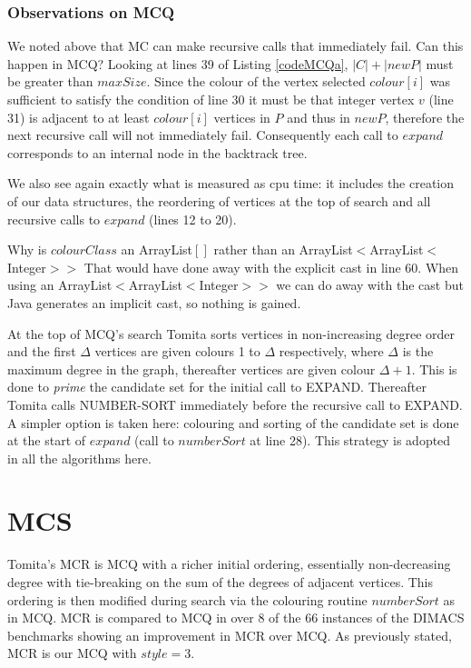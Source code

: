 \documentclass{l4proj}
\begin{document}
\subsubsection{Observations on MCQ}
We noted above that MC can make recursive calls that immediately fail. Can this happen in MCQ? Looking at 
lines 39 of Listing \ref{codeMCQa}, $|C| + |newP|$ must be greater than $maxSize$. Since the colour of the vertex selected
$colour[i]$ was sufficient to satisfy the condition of line 30 it must be that integer vertex $v$ (line 31) is
adjacent to at least $colour[i]$ vertices in $P$ and thus in $newP$, therefore the next recursive call will not immediately fail.
Consequently each call to $expand$ corresponds to an internal node in the backtrack tree.

We also see again exactly what is measured as cpu time: it includes the creation of our data structures, the reordering
of vertices at the top of search and all recursive calls to $expand$ (lines 12 to 20).

Why is $colourClass$ an ArrayList$[]$ rather than an ArrayList$<$ArrayList$<$Integer$>>$ That would have done
away with the explicit cast in line 60. When using an ArrayList$<$ArrayList$<$Integer$>>$ we can do away with the cast
but Java generates an implicit cast, so nothing is gained.

At the top of MCQ's search Tomita sorts vertices in non-increasing degree order
and the first $\Delta$ vertices are given colours 1 to $\Delta$ respectively, where $\Delta$ is the maximum degree in the graph, thereafter
vertices are given colour $\Delta + 1$. This is done to \emph{prime} the candidate set for the initial call to EXPAND.
Thereafter Tomita calls NUMBER-SORT immediately before the recursive call to EXPAND. A simpler option is taken here:
colouring and sorting of the candidate set is done at the start of $expand$ (call to $numberSort$ at line 28). This strategy 
is adopted in all the algorithms here.


%
\section{MCS}
\label{sec:mcsCode}
Tomita's MCR \cite{tomita2007} is MCQ with a richer initial ordering, essentially 
non-decreasing degree with tie-breaking on the sum of the degrees of adjacent vertices. This ordering
is then modified during search via the colouring routine $numberSort$ as in MCQ. MCR is
compared to MCQ in \cite{tomita2007} over 8 of the 66 instances of the DIMACS benchmarks \cite{DIMACS}
showing an improvement in MCR over MCQ. As previously stated, MCR is our MCQ with $style = 3$.
\end{document}
